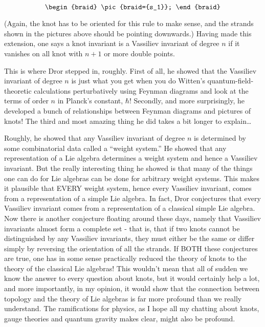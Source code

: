 \documentclass{article}
\begin{document}
\[
  \begin{braid}
    \pic{braid={s_1}};
  \end{braid}
\]

(Again, the knot has to be oriented for this rule to make sense, and the
strands shown in the pictures above should be pointing downwards.)
Having made this extension, one says a knot invariant is a Vassiliev
invariant of degree \(n\) if it vanishes on all knot with \(n+1\) or
more double points.

This is where Dror stepped in, roughly. First of all, he showed that the
Vassiliev invariant of degree \(n\) is just what you get when you do
Witten's quantum-field-theoretic calculations perturbatively using
Feynman diagrams and look at the terms of order \(n\) in Planck's
constant, \(\hbar\)! Secondly, and more surprisingly, he developed a
bunch of relationships between Feynman diagrams and pictures of knots!
The third and most amazing thing he did takes a bit longer to
explain\ldots{}

Roughly, he showed that any Vassiliev invariant of degree \(n\) is
determined by some combinatorial data called a ``weight system.'' He
showed that any representation of a Lie algebra determines a weight
system and hence a Vassiliev invariant. But the really interesting thing
he showed is that many of the things one can do for Lie algebras can be
done for arbitrary weight systems. This makes it plausible that EVERY
weight system, hence every Vassiliev invariant, comes from a
representation of a simple Lie algebra. In fact, Dror conjectures that
every Vassiliev invariant comes from a representation of a classical
simple Lie algebra. Now there is another conjecture floating around
these days, namely that Vassiliev invariants almost form a complete set
- that is, that if two knots cannot be distinguished by any Vassiliev
invariants, they must either be the same or differ simply by reversing
the orientation of all the strands. If BOTH these conjectures are true,
one has in some sense practically reduced the theory of knots to the
theory of the classical Lie algebras! This wouldn't mean that all of
sudden we know the answer to every question about knots, but it would
certainly help a lot, and more importantly, in my opinion, it would show
that the connection between topology and the theory of Lie algebras is
far more profound than we really understand. The ramifications for
physics, as I hope all my chatting about knots, gauge theories and
quantum gravity makes clear, might also be profound.
\end{document}
